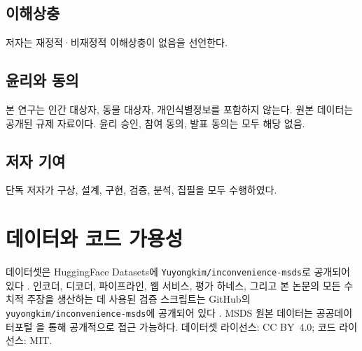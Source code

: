 \documentclass[journal]{IEEEtran}
\begin{document}
\subsection*{이해상충}
저자는 재정적·비재정적 이해상충이 없음을 선언한다.

\subsection*{윤리와 동의}
본 연구는 인간 대상자, 동물 대상자, 개인식별정보를 포함하지 않는다. 원본 데이터는 공개된 규제 자료이다. 윤리 승인, 참여 동의, 발표 동의는 모두 해당 없음.

\subsection*{저자 기여}
단독 저자가 구상, 설계, 구현, 검증, 분석, 집필을 모두 수행하였다.

\section*{데이터와 코드 가용성}

데이터셋은 HuggingFace Datasets에 \texttt{Yuyongkim/inconvenience-msds}로 공개되어 있다 \cite{hf_dataset}. 인코더, 디코더, 파이프라인, 웹 서비스, 평가 하네스, 그리고 본 논문의 모든 수치적 주장을 생산하는 데 사용된 검증 스크립트는 GitHub의 \texttt{yuyongkim/inconvenience-msds}에 공개되어 있다 \cite{github_repo}. MSDS 원본 데이터는 공공데이터포털 \cite{data_go_kr}을 통해 공개적으로 접근 가능하다. 데이터셋 라이선스: CC BY~4.0; 코드 라이선스: MIT.
\end{document}
